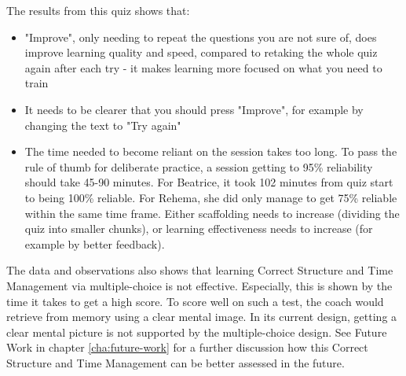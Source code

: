   The results from this quiz shows that:
  \begin{itemize}
  \item "Improve", only needing to repeat the questions you are not sure of, does improve learning quality and speed, compared to retaking the whole quiz again after each try - it makes learning more focused on what you need to train
  \item It needs to be clearer that you should press "Improve", for example by changing the text to "Try again"
  \item The time needed to become reliant on the session takes too long. To pass the rule of thumb for deliberate practice, a session getting to 95\% reliability should take 45-90 minutes. For Beatrice, it took 102 minutes from quiz start to being 100\% reliable. For Rehema, she did only manage to get 75\% reliable within the same time frame. Either scaffolding needs to increase (dividing the quiz into smaller chunks), or learning effectiveness needs to increase (for example by better feedback).
  \end{itemize}

The data and observations also shows that learning Correct Structure and Time Management via multiple-choice is not effective. Especially, this is shown by the time it takes to get a high score. To score well on such a test, the coach would retrieve from memory using a clear mental image. In its current design, getting a clear mental picture is not supported by the multiple-choice design. See Future Work in chapter \ref{cha:future-work} for a further discussion how this Correct Structure and Time Management can be better assessed in the future.
